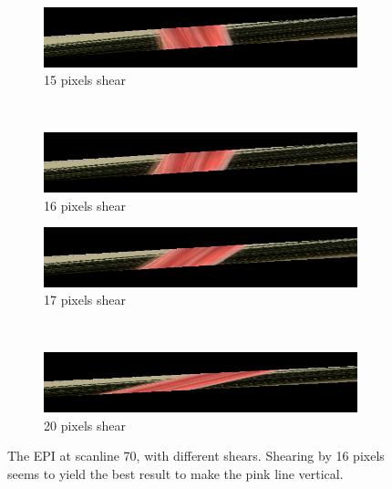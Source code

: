 \documentclass[a4paper]{article}
\begin{document}
\begin{figure}[ht]
	\vspace{2mm}
	\begin{subfigure}[h]{0.48\textwidth}
	  \centering
	  \includegraphics[width=\textwidth]{shear15}
	  \caption*{15 pixels shear}
	\end{subfigure}
	~
	\begin{subfigure}[h]{0.48\textwidth}
	  \centering
	  \includegraphics[width=\textwidth]{shear16}
	  \caption*{16 pixels shear}
	\end{subfigure}
		
	\vspace{2mm}
	\begin{subfigure}[h]{0.48\textwidth}
	  \centering
	  \includegraphics[width=\textwidth]{shear17}
	  \caption*{17 pixels shear}
	\end{subfigure}
	~
	\begin{subfigure}[h]{0.48\textwidth}
	  \centering
	  \includegraphics[width=\textwidth]{shear20}
	  \caption*{20 pixels shear}
	\end{subfigure}
\caption{The EPI at scanline 70, with different shears. Shearing by 16 pixels seems to yield the best result to make the pink line vertical.}
\label{fig:shearedInterpolationEPIs}
\end{figure}
\end{document}
